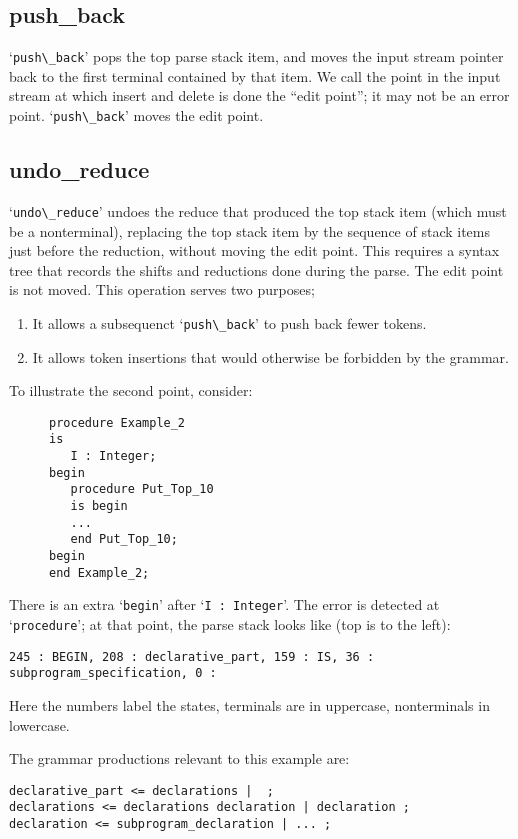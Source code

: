 \documentclass{article}
\newcommand{\code}[1]{`\lstinline|#1|'}
\begin{document}
\subsection{push\_back}
\code{push\_back} pops the top parse stack item, and moves the input
stream pointer back to the first terminal contained by that item. We
call the point in the input stream at which insert and delete is done
the ``edit point''; it may not be an error point. \code{push\_back}
moves the edit point.

\subsection{undo\_reduce}
\code{undo\_reduce} undoes the reduce that produced the top stack item
(which must be a nonterminal), replacing the top stack item by the
sequence of stack items just before the reduction, without
moving the edit point. This requires a syntax tree that records the
shifts and reductions done during the parse. The edit point is not
moved. This operation serves two purposes;
\begin{enumerate}
\item It allows a subsequenct \code{push\_back} to push back fewer tokens.

\item It allows token insertions that would otherwise be forbidden by the
grammar.
\end{enumerate}

To illustrate the second point, consider:
\begin{figure}[H]
\begin{lstlisting}
procedure Example_2
is
   I : Integer;
begin
   procedure Put_Top_10
   is begin
   ...
   end Put_Top_10;
begin
end Example_2;
\end{lstlisting}
\caption{}
\label{ex:extra_begin_2}
\end{figure}
There is an extra \code{begin} after
\code{I : Integer}. The error is detected at \code{procedure}; at that point,
the parse stack looks like (top is to the left):
\small{
\begin{verbatim}
245 : BEGIN, 208 : declarative_part, 159 : IS, 36 : subprogram_specification, 0 :
\end{verbatim}
}
Here the numbers label the states, terminals are in uppercase,
nonterminals in lowercase.

The grammar productions relevant to this example are:
\begin{verbatim}
declarative_part <= declarations |  ;
declarations <= declarations declaration | declaration ;
declaration <= subprogram_declaration | ... ;
\end{verbatim}
\end{document}
